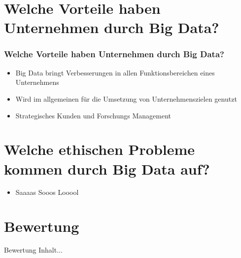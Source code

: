 \documentclass[10pt,a4paper]{beamer}
\begin{document}
\section{Welche Vorteile haben Unternehmen durch Big Data?}
\begin{frame}
\frametitle{Welche Vorteile haben Unternehmen durch Big Data?}
\begin{itemize}
	\item Big Data bringt Verbesserungen in allen Funktionsbereichen eines Unternehmens \pause
	\item Wird im allgemeinen für die Umsetzung von Unternehmenszielen genutzt \pause
	\item Strategisches Kunden und Forschungs Management
\end{itemize}
\end{frame}

\section{Welche ethischen Probleme kommen durch Big Data auf?}
\begin{frame}
\begin{itemize}
\frametitle{Welche ethischen Probleme kommen durch Big Data auf?}
\item  Saaaas Sooos Looool
\end{itemize}
\end{frame}

\section{Bewertung}
\begin{frame}{Bewertung}
Inhalt...
\end{frame}
\end{document}
